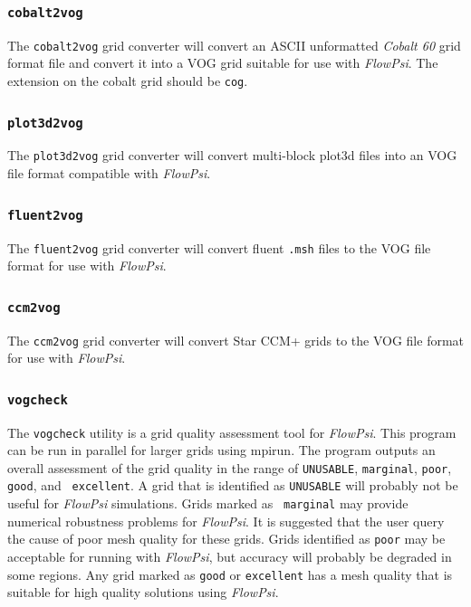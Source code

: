 \documentclass{article}
\begin{document}
\subsubsection{\tt cobalt2vog}

The {\tt cobalt2vog} grid converter will convert an ASCII unformatted {\it Cobalt 60} grid format file and convert it into a VOG grid suitable for use with {\em FlowPsi}.  The extension on the cobalt grid should be {\tt cog}.

\subsubsection{\tt plot3d2vog}

The {\tt plot3d2vog} grid converter will convert multi-block plot3d
files into an VOG file format compatible with {\em FlowPsi}.

\subsubsection{\tt fluent2vog}

The {\tt fluent2vog} grid converter will convert fluent {\tt .msh}
files to the VOG file format for use with {\em FlowPsi}.

\subsubsection{\tt ccm2vog}

The {\tt ccm2vog} grid converter will convert Star CCM+ grids to the VOG file format for use with {\em FlowPsi}.


\subsubsection{\tt vogcheck}

The {\tt vogcheck} utility is a grid quality assessment tool for {\em FlowPsi}.
This program can be run in parallel for larger grids using mpirun.
The program outputs an overall assessment of the grid quality in the
range of {\tt UNUSABLE}, {\tt marginal}, {\tt poor}, {\tt good}, and {\tt
  excellent}.  A grid that is identified as {\tt UNUSABLE} will
probably not be useful for {\em FlowPsi} simulations.  Grids marked as {\tt
  marginal} may provide numerical robustness problems for {\em FlowPsi}.  It is
suggested that the user query the cause of poor mesh quality for these
grids.  Grids identified as {\tt poor} may be acceptable for
running with {\em FlowPsi}, but accuracy will probably be degraded in some
regions.  Any grid marked as {\tt good} or {\tt excellent} has a mesh
quality that is suitable for high quality solutions using {\em FlowPsi}.
\end{document}

